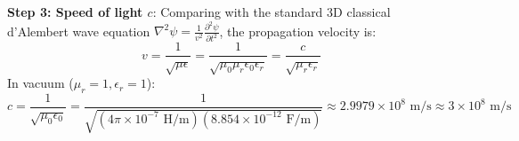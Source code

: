\begin{theorysol}
\textbf{Step 3: Speed of light $c$}:
Comparing with the standard 3D classical d'Alembert wave equation $\nabla^2 \psi = \frac{1}{v^2}\frac{\partial^2 \psi}{\partial t^2}$, the propagation velocity is:
\begin{equation}
v = \frac{1}{\sqrt{\mu\epsilon}} = \frac{1}{\sqrt{\mu_0 \mu_r \epsilon_0 \epsilon_r}} = \frac{c}{\sqrt{\mu_r \epsilon_r}}
\end{equation}
In vacuum ($\mu_r = 1, \epsilon_r = 1$):
\begin{equation}
c = \frac{1}{\sqrt{\mu_0 \epsilon_0}} = \frac{1}{\sqrt{(4\pi \times 10^{-7}\text{ H/m})(8.854 \times 10^{-12}\text{ F/m})}} \approx 2.9979 \times 10^8\text{ m/s} \approx 3 \times 10^8\text{ m/s}
\end{equation}
\end{theorysol}
\vspace{4mm}

